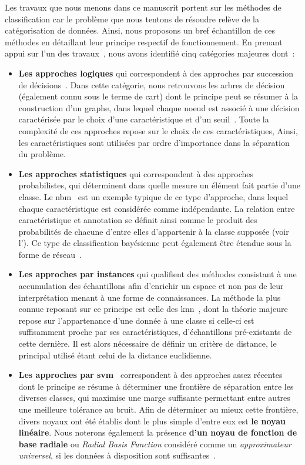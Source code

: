 Les travaux que nous menons dans ce manuscrit portent sur les méthodes de classification car le problème que nous tentons de résoudre relève de la catégorisation de données. Ainsi, nous proposons un bref échantillon de ces méthodes en détaillant leur principe respectif de fonctionnement. En prenant appui sur l'un des travaux~\cite{Kotsiantis2007}, nous avons identifié cinq catégories majeures dont~:
\begin{itemize}
    \item \textbf{Les approches logiques} qui correspondent à des approches par succession de décisions~\cite{Kotsiantis2007}. Dans cette catégorie, nous retrouvons les arbres de décision~\cite{Breiman1984} (également connu sous le terme de \gls{cart}) dont le principe peut se résumer à la construction d'un graphe, dans lequel chaque noeud est associé à une décision caractérisée par le choix d'une caractéristique et d'un seuil~\cite{Quinlan1986}. Toute la complexité de ces approches repose sur le choix de ces caractéristiques, Ainsi, les caractéristiques sont utilisées par ordre d'importance dans la séparation du problème.
    \item \textbf{Les approches statistiques} qui correspondent à des approches probabilistes, qui déterminent dans quelle mesure un élément fait partie d'une classe. Le \gls{nbm}~\cite{Zhang2004} est un exemple typique de ce type d'approche, dans lequel chaque caractéristique est considérée comme indépendante. La relation entre caractéristique et annotation se définit ainsi comme le produit des probabilités de chacune d'entre elles d'appartenir à la classe supposée (voir l'). Ce type de classification bayésienne peut également être étendue sous la forme de réseau~\cite{Kononenko1989}.
    \item \textbf{Les approches par instances} qui qualifient des méthodes consistant à une accumulation des échantillons afin d'enrichir un espace et non pas de leur interprétation menant à une forme de connaissances. La méthode la plus connue reposant sur ce principe est celle des \gls{knn}~\cite{Cover1967}, dont la théorie majeure repose sur l'appartenance d'une donnée à une classe si celle-ci est suffisamment proche par ses caractéristiques, d'échantillons pré-existants de cette dernière. Il est alors nécessaire de définir un critère de distance, le principal utilisé étant celui de la distance euclidienne. 
    \item \textbf{Les approches par \gls{svm}}~\cite{Cortes1995} correspondent à des approches assez récentes dont le principe se résume à déterminer une frontière de séparation entre les diverses classes, qui maximise une marge suffisante permettant entre autres une meilleure tolérance au bruit. Afin de déterminer au mieux cette frontière, divers noyaux ont été établis dont le plus simple d'entre eux est \textbf{le noyau linéaire}. Nous noterons également la présence \textbf{d'un noyau de fonction de base radiale} ou \textit{Radial Basis Function} considéré comme un \textit{approximateur universel}, si les données à disposition sont suffisantes~\cite{Wang2004}.

\end{itemize}
